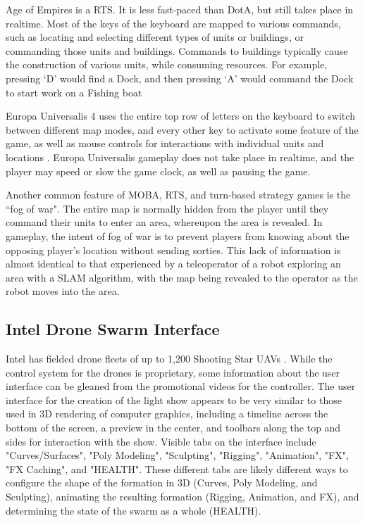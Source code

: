 Age of Empires is a RTS. 
It is less fast-paced than DotA, but still takes place in realtime. 
Most of the keys of the keyboard are mapped to various commands, such as locating and selecting different types of units or buildings, or commanding those units and buildings. 
Commands to buildings typically cause the construction of various units, while consuming resources. 
For example, pressing `D' would find a Dock, and then pressing `A' would command the Dock to start work on a Fishing boat \citep{AOEControls}

Europa Universalis 4 uses the entire top row of letters on the keyboard to switch between different map modes, and every other key to activate some feature of the game, as well as mouse controls for interactions with individual units and locations \citep{EUControls}. 
Europa Universalis gameplay does not take place in realtime, and the player may speed or slow the game clock, as well as pausing the game. 

Another common feature of MOBA, RTS, and turn-based strategy games is the ``fog of war". 
The entire map is normally hidden from the player until they command their units to enter an area, whereupon the area is revealed. 
In gameplay, the intent of fog of war is to prevent players from knowing about the opposing player's location without sending sorties. 
This lack of information is almost identical to that experienced by a teleoperator of a robot exploring an area with a SLAM algorithm, with the map being revealed to the operator as the robot moves into the area. 

\subsection{Intel Drone Swarm Interface} \label{section:Intel_Drone_Swarm_Interface}

Intel has fielded drone fleets of up to 1,200 Shooting Star UAVs \citep{IntelDronesPage}. 
While the control system for the drones is proprietary, some information about the user interface can be gleaned from the promotional videos for the controller. 
The user interface for the creation of the light show appears to be very similar to those used in 3D rendering of computer graphics, including a timeline across the bottom of the screen, a preview in the center, and toolbars along the top and sides for interaction with the show. 
Visible tabs on the interface include "Curves/Surfaces", "Poly Modeling", "Sculpting", "Rigging", "Animation", "FX", "FX Caching", and "HEALTH". 
These different tabs are likely different ways to configure the shape of the formation in 3D (Curves, Poly Modeling, and Sculpting), animating the resulting formation (Rigging, Animation, and FX), and determining the state of the swarm as a whole (HEALTH). 

